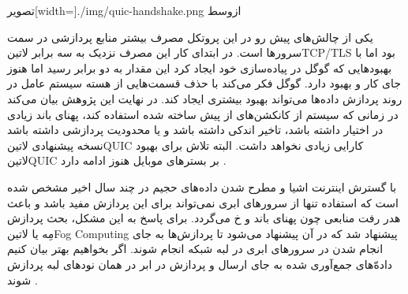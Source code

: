 ‌تصویر[width=\textwidth]{./img/quic-handshake.png}
‌ازوسط

یکی از چالش‌های پیش رو در این پروتکل مصرف بیشتر منابع پردازشی در سمت سرورها است. در ابتدای کار این مصرف نزدیک به سه برابر ‌لاتین{TCP/TLS} بود اما با بهبودهایی که گوگل در پیاده‌سازی خود ایجاد کرد
این مقدار به دو برابر رسید اما هنوز جای کار و بهبود دارد. گوگل فکر می‌کند با حذف قسمت‌هایی از هسته سیستم عامل در روند پردازش داده‌ها می‌تواند بهبود بیشتری ایجاد کند.
در نهایت این پژوهش بیان می‌کند در زمانی که سیستم از کانکشن‌های از پیش ساخته شده استفاده کند، پهنای باند زیادی در اختیار داشته باشد، تاخیر اندکی داشته باشد و یا محدودیت پردازشی داشته باشد نسخه پیشنهادی
‌لاتین{QUIC} کارایی زیادی نخواهد داشت. البته تلاش برای بهبود ‌لاتین{QUIC} بر بسترهای موبایل هنوز ادامه دارد
.


با گسترش اینترنت اشیا و مطرح شدن داده‌های حجیم در چند سال اخیر مشخص شده است که استفاده تنها از سرورهای ابری نمی‌تواند برای این پردازش مفید باشد و باعث هدر رفت منابعی چون پهنای باند و ‌خ می‌گردد.
برای پاسخ به این مشکل، بحث پردازش مِه یا ‌لاتین{Fog Computing} پیشنهاد شد که در آن پیشنهاد می‌شود تا پردازش‌ها به جای انجام شدن در سرورهای ابری در لبه شبکه انجام شوند.
اگر بخواهیم بهتر بیان کنیم داده‌ّهای جمع‌آوری شده به جای ارسال و پردازش در ابر در همان نودهای لبه پردازش شوند
.

